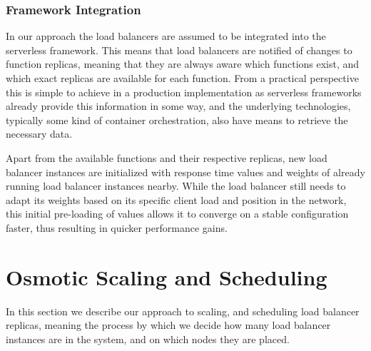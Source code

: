 \documentclass[draft,final]{vutinfth} %
\begin{document}
\subsubsection{Framework Integration}
In our approach the load balancers are assumed to be integrated into the serverless framework.
This means that load balancers are notified of changes to function replicas, meaning that they are always aware which functions exist, and which exact replicas are available for each function.
From a practical perspective this is simple to achieve in a production implementation as serverless frameworks already provide this information in some way, and the underlying technologies, typically some kind of container orchestration, also have means to retrieve the necessary data.

Apart from the available functions and their respective replicas, new load balancer instances are initialized with response time values and weights of already running load balancer instances nearby.
While the load balancer still needs to adapt its weights based on its specific client load and position in the network, this initial pre-loading of values allows it to converge on a stable configuration faster, thus resulting in quicker performance gains.



\section{Osmotic Scaling and Scheduling}
In this section we describe our approach to scaling, and scheduling load balancer replicas, meaning the process by which we decide how many load balancer instances are in the system, and on which nodes they are placed.
\end{document}
